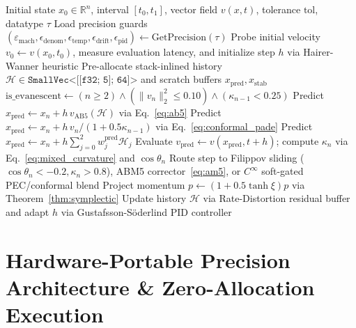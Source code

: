 \documentclass[10pt,twocolumn,letterpaper]{article}
\theoremstyle{definition}
\theoremstyle{remark}
\newcommand{\R}{\mathbb{R}}
\newcommand{\epsmach}{\varepsilon_{\mathrm{mach}}}
\begin{document}
\begin{algorithm}[t]
\caption{\texttt{SelfOptimizingMetaIntegrator::solve\_interval} (Autonomous Multi-Regime ODE Solver)}
\label{alg:meta_integrator}
\begin{algorithmic}[1]
\Require Initial state $x_0 \in \R^n$, interval $[t_0, t_1]$, vector field $v(x,t)$, tolerance $\mathrm{tol}$, datatype $\tau$
\State Load precision guards $(\epsmach, \epsilon_{\mathrm{denom}}, \epsilon_{\mathrm{temp}}, \epsilon_{\mathrm{drift}}, \epsilon_{\mathrm{pid}}) \gets \text{GetPrecision}(\tau)$
\State Probe initial velocity $v_0 \gets v(x_0, t_0)$, measure evaluation latency, and initialize step $h$ via Hairer-Wanner heuristic
\State Pre-allocate stack-inlined history $\mathcal{H} \in \texttt{SmallVec<[[f32; 5]; 64]>}$ and scratch buffers $x_{\mathrm{pred}}, x_{\mathrm{stab}}$
  \State $\text{is\_evanescent} \gets (n \ge 2) \land (\|v_n\|_2^2 \le 0.10) \land (\kappa_{n-1} < 0.25)$ 
    \State Predict $x_{\mathrm{pred}} \gets x_n + h\, v_{\mathrm{AB5}}(\mathcal{H})$ via Eq.~\eqref{eq:ab5}
    \State Predict $x_{\mathrm{pred}} \gets x_n + h\, v_n / (1 + 0.5\kappa_{n-1})$ via Eq.~\eqref{eq:conformal_pade}
  \Else
    \State Predict $x_{\mathrm{pred}} \gets x_n + h \sum_{j=0}^2 w_j^{\mathrm{pred}} \mathcal{H}_j$
  \EndIf
  \State Evaluate $v_{\mathrm{pred}} \gets v(x_{\mathrm{pred}}, t + h)$; compute $\kappa_n$ via Eq.~\eqref{eq:mixed_curvature} and $\cos\theta_n$
  \State Route step to Filippov sliding ($\cos\theta_n < -0.2, \kappa_n > 0.8$), ABM5 corrector~\eqref{eq:am5}, or $C^\infty$ soft-gated PEC/conformal blend
    \State Project momentum $p \leftarrow (1 + 0.5\tanh\xi)p$ via Theorem~\ref{thm:symplectic}
  \EndIf
  \State Update history $\mathcal{H}$ via Rate-Distortion residual buffer and adapt $h$ via Gustafsson-S\"oderlind PID controller~\cite{gustafsson1994control,soderlind2002automatic}
\EndWhile
\end{algorithmic}
\end{algorithm}

\section{Hardware-Portable Precision Architecture \& Zero-Allocation Execution}
\label{sec:architecture}
\end{document}
